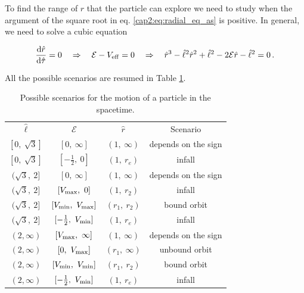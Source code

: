 To find the range of $r$ that the particle can explore we need to study when the
argument of the square root in eq. \ref{cap2:eq:radial_eq_as} is positive.
In general, we need to solve a cubic equation

\begin{equation}
    \dv{\hat r}{\hat \tau} = 0
    \quad \Rightarrow \quad
    \mathcal E - V_{\rm eff} = 0
    \quad \Rightarrow \quad
    \hat r^3 - \hat \ell^2 \hat r^2 + \hat \ell^2 - 2 \mathcal E
    \hat r - \hat \ell^2 = 0 \, .
    \label{cap2:eq:cubic_eq}
\end{equation}

All the possible scenarios are resumed in Table \ref{cap2:tab:scenarios}.

\begin{table}[h]
    \centering
    \begin{tabular}{cccc}
        $\hat \ell$     & $\mathcal E$                  & $\hat r$     
                                                        & Scenario \\
        $[0,~\sqrt{3}]$ & $[0,~\infty]$                 & $(1,~\infty)$
                                                        & depends on the sign\\
        $[0,~\sqrt{3}]$ & $[-\frac{1}{2},~0]$           & $(1,~r_e)$   
                                                        & infall \\
        $(\sqrt{3},~2]$ & $[0,~\infty]$                 & $(1,~\infty)$ 
                                                        & depends on the sign \\
        $(\sqrt{3},~2]$ & $[V_{\rm max},~0]$            & $(1,~r_2)$
                                                        & infall \\
        $(\sqrt{3},~2]$ & $[V_{\rm min},~V_{\rm max}]$  & $(r_1,~r_2)$
                                                        & bound orbit \\
        $(\sqrt{3},~2]$ & $[-\frac{1}{2},~V_{\rm min}]$ & $(1,~r_e)$
                                                        & infall \\
        $(2, \infty)$   & $[V_{\rm max},~\infty]$       & $(1,~\infty)$ 
                                                        & depends on the sign \\
        $(2, \infty)$   & $[0,~V_{\rm max}]$            & $(r_1,~\infty)$
                                                        & unbound orbit \\
        $(2, \infty)$   & $[V_{\rm min},~V_{\rm min}]$  & $(r_1,~r_2)$
                                                        & bound orbit \\
        $(2, \infty)$   & $[-\frac{1}{2},~V_{\rm min}]$ & $(1,~r_e)$
                                                        & infall \\
    \end{tabular}
    \caption{Possible scenarios for the motion of a particle in the \Sh
    spacetime.}
    \label{cap2:tab:scenarios}
\end{table}

